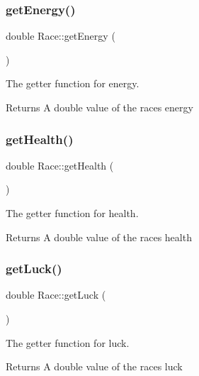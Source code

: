 \subsubsection{\texorpdfstring{getEnergy()}{getEnergy()}}
{\footnotesize\ttfamily double Race\+::get\+Energy (\begin{DoxyParamCaption}{ }\end{DoxyParamCaption})}



The getter function for energy. 

\begin{DoxyReturn}{Returns}
A double value of the race\textquotesingle{}s energy 
\end{DoxyReturn}
\mbox{\label{class_race_aab95fe052513d6687f9f209e13fdcb4f}} 
\subsubsection{\texorpdfstring{getHealth()}{getHealth()}}
{\footnotesize\ttfamily double Race\+::get\+Health (\begin{DoxyParamCaption}{ }\end{DoxyParamCaption})}



The getter function for health. 

\begin{DoxyReturn}{Returns}
A double value of the race\textquotesingle{}s health 
\end{DoxyReturn}
\mbox{\label{class_race_a503ddb5daf02df19da4a1bcf27bc0012}} 
\subsubsection{\texorpdfstring{getLuck()}{getLuck()}}
{\footnotesize\ttfamily double Race\+::get\+Luck (\begin{DoxyParamCaption}{ }\end{DoxyParamCaption})}



The getter function for luck. 

\begin{DoxyReturn}{Returns}
A double value of the race\textquotesingle{}s luck 
\end{DoxyReturn}
\mbox{\label{class_race_a79b3f4908fd0c1e87a8160758ec78b6e}} 
